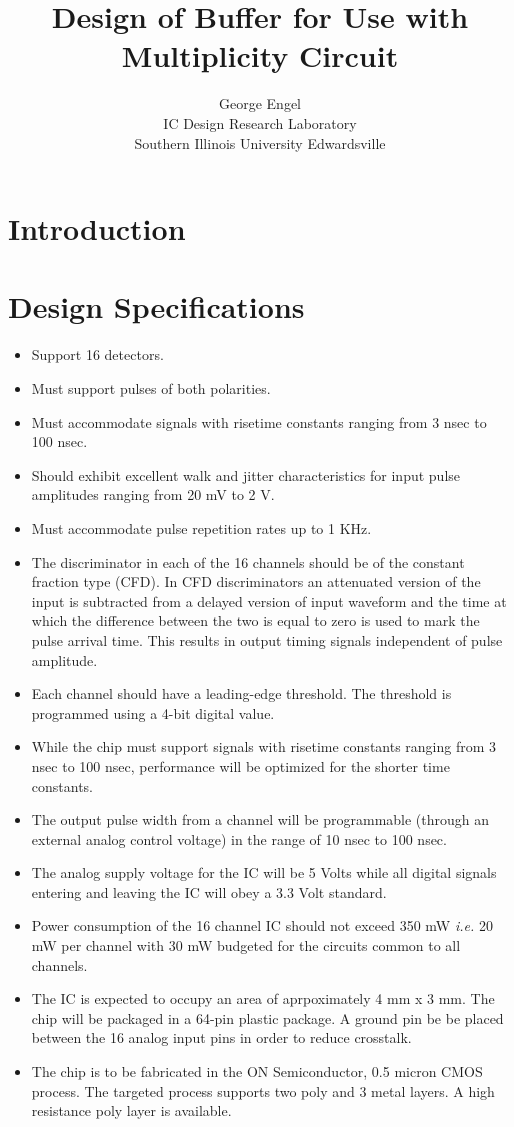 \documentclass[12pt, onecolumn]{IEEEtran}
\author{George Engel\\
IC Design Research Laboratory\\
Southern Illinois University Edwardsville\\
}
\title{Design of Buffer for Use with Multiplicity Circuit}
\begin{document}

\maketitle


\section*{Introduction}

\noindent


\section*{Design Specifications}
\noindent

\begin{itemize}
\item
Support 16 detectors.
\item
Must support pulses of both polarities.
\item
Must accommodate signals with risetime constants ranging from 3 nsec to 100 nsec.
\item
Should exhibit excellent walk and jitter characteristics for input pulse amplitudes ranging from 20 mV to 2 V. 
\item
Must accommodate pulse repetition rates up to 1 KHz.
\item
The discriminator in each of the 16 channels should be of the constant fraction type (CFD). In CFD discriminators an attenuated version of the input is subtracted from a delayed version of input waveform and the time at which the difference between the two is equal to zero is used to mark the pulse arrival time. This results in output timing signals independent of pulse amplitude.
\item
Each channel should have a leading-edge threshold. The threshold is programmed using a 4-bit digital value.
\item
While the chip must support signals with risetime constants ranging from 3 nsec to 100 nsec, performance will be optimized for the shorter time constants. 
\item
The output pulse width from a channel will be programmable (through an external analog control voltage) in the range of 10 nsec to 100 nsec.
\item
The analog supply voltage for the IC will be 5 Volts while all digital signals entering and leaving the IC will obey a 3.3 Volt standard.
\item
Power consumption of the 16 channel IC should not exceed 350 mW \emph{i.e.} 20 mW per channel with 30 mW budgeted for the circuits common to all channels. 
\item
The IC is expected to occupy an area of aprpoximately 4 mm x 3 mm.  The chip will be packaged in a 64-pin plastic package.  A ground pin be be placed between the 16 analog input pins in order to reduce crosstalk.
\item
The chip is to be fabricated in the ON Semiconductor, 0.5 micron CMOS process.  The targeted process supports two poly and 3 metal layers.  A high resistance poly layer is available.
\end{itemize} 
 
\end{document}
